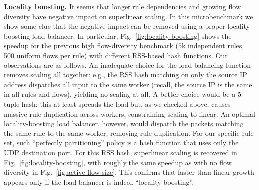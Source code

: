 \noindent%
\textbf{Locality boosting.} %
It seems that longer rule dependencies and growing flow diversity have negative impact on superlinear scaling. In this microbenchmark we show some clue that the negative impact can be removed using a proper locality boosting load balancer. In particular, Fig.~\ref{fig:locality-boosting} shows the speedup for the previous high flow-diversity benchmark ($5$k independent rules, 500 uniform flows per rule) with different RSS-based hash functions. Our observations are as follows. An inadequate choice for the load balancing function removes scaling all together: e.g., the RSS hash matching on only the source IP address dispatches all input to the same worker (recall, the source IP is the same in all rules and flows), yielding no scaling at all. A better choice would be a 5-tuple hash: this at least spreads the load but, as we checked above, causes massive rule duplication across workers, constraining scaling to linear.  An optimal locality-boosting load balancer, however, would dispatch the packets matching the same rule to the same worker, removing rule duplication. For our specific rule set, such ``perfectly partitioning'' policy is a hash function that uses only the UDP destination port. For this RSS hash, superlinear scaling is recovered in Fig.~\ref{fig:locality-boosting}, with roughly the same speedup as with no flow diversity in Fig.~\ref{fig:active-flow-size}.  This confirms that faster-than-linear growth appears only if the load balancer is indeed ``locality-boosting''. %


